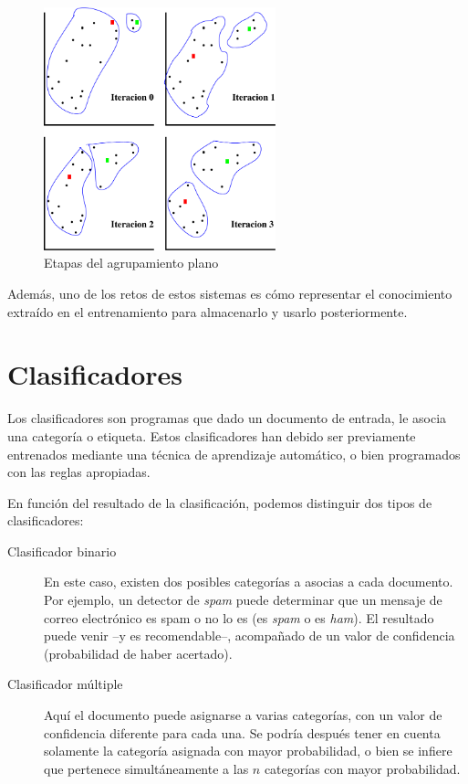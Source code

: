 \begin{figure}[htbp]
\centering
\includegraphics[width=0.6\textwidth]{k-medias}
\caption[Etapas del agrupamiento plano]{Etapas del agrupamiento plano \citep{RuizReina2013}}
\label{fig:k-medias}
\end{figure}

Además, uno de los retos de estos sistemas es cómo representar el conocimiento extraído en el entrenamiento para almacenarlo y usarlo posteriormente.

\section{Clasificadores}

Los clasificadores son programas que dado un documento de entrada, le asocia una categoría o etiqueta. Estos clasificadores han debido ser previamente entrenados mediante una técnica de aprendizaje automático, o bien programados con las reglas apropiadas.

En función del resultado de la clasificación, podemos distinguir dos tipos de clasificadores:
\nopagebreak
\begin{description}
\item[Clasificador binario] En este caso, existen dos posibles categorías a asocias a cada documento. Por ejemplo, un detector de \emph{spam} puede determinar que un mensaje de correo electrónico es spam o no lo es (es \emph{spam} o es \emph{ham}). El resultado puede venir --y es recomendable--, acompañado de un valor de confidencia (probabilidad de haber acertado).
\item[Clasificador múltiple] Aquí el documento puede asignarse a varias categorías, con un valor de confidencia diferente para cada una. Se podría después tener en cuenta solamente la categoría asignada con mayor probabilidad, o bien se infiere que pertenece simultáneamente a las $n$ categorías con mayor probabilidad.
\end{description}



